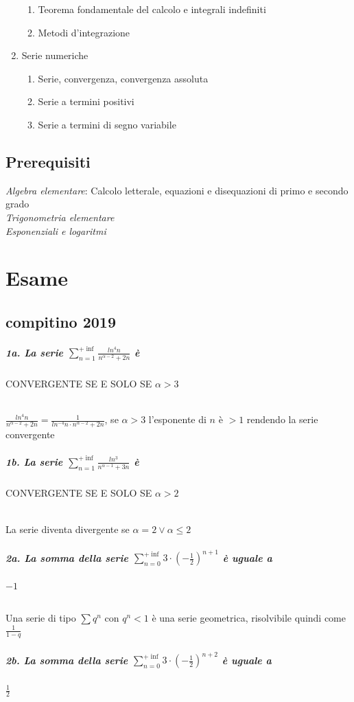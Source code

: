 \documentclass[12pt, a4paper, openany]{book}
\begin{document}
\begin{enumerate}
\begin{enumerate}
    \item Teorema fondamentale del calcolo e integrali indefiniti
    \item Metodi d'integrazione
\end{enumerate}
\item Serie numeriche
\begin{enumerate}
    \item Serie, convergenza, convergenza assoluta
    \item Serie a termini positivi
    \item Serie a termini di segno variabile
\end{enumerate}
\end{enumerate}

\section{Prerequisiti}
\emph{Algebra elementare}: Calcolo letterale, equazioni e disequazioni di primo e secondo grado
\\\emph{Trigonometria elementare}
\\\emph{Esponenziali e logaritmi}
\chapter{Esame}
\section{compitino 2019}
\paragraph{1a. La serie $\sum^{+\inf}_{n=1} \frac{ln^4n}{n^{\alpha - 2} + 2n}$ è} CONVERGENTE SE E SOLO SE $\alpha > 3$
\subparagraph{}
$\frac{ln^4n}{n^{\alpha - 2} + 2n} = \frac{1}{ln^{-4}n\cdot n^{\alpha-2}+2n} $,  se $\alpha >3$ l'esponente di $n$ è $>1$ rendendo la serie convergente

\paragraph{1b. La serie $\sum^{+\inf}_{n=1} \frac{ln^3}{n^{\alpha - 1} + 3n}$ è} CONVERGENTE SE E SOLO SE $\alpha > 2$
\subparagraph{} La serie diventa divergente se $\alpha = 2 \lor \alpha \leq 2$

\paragraph{2a. La somma della serie $\sum^{+\inf}_{n=0} 3\cdot (-\frac{1}{2})^{n+1}$ è uguale a} $-1$
\subparagraph{}
Una serie di tipo $\sum q^n$ con $q^n < 1$ è una serie geometrica, risolvibile quindi come $\frac{1}{1-q}$
\paragraph{2b. La somma della serie $\sum^{+\inf}_{n=0} 3\cdot (-\frac{1}{2})^{n+2}$ è uguale a} $\frac{1}{2}$
\end{document}
